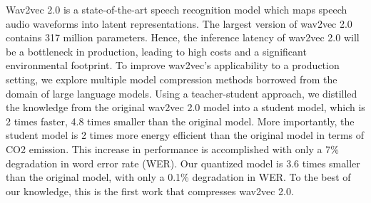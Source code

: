Wav2vec 2.0 is a state-of-the-art speech recognition model which maps speech audio waveforms into latent representations. The largest version of wav2vec 2.0 contains 317 million parameters. Hence, the inference latency of wav2vec 2.0 will be a bottleneck in production, leading to high costs and a significant environmental footprint. To improve wav2vec's applicability to a production setting, we explore multiple model compression methods borrowed from the domain of large language models. Using a teacher-student approach, we distilled the knowledge from the original wav2vec 2.0 model into a student model, which is 2 times faster, 4.8 times smaller than the original model. More importantly, the student model is 2 times more energy efficient than the original model in terms of CO2 emission. This increase in performance is accomplished with only a 7\% degradation in word error rate (WER). Our quantized model is 3.6 times smaller than the original model, with only a 0.1\% degradation in WER. To the best of our knowledge, this is the first work that compresses wav2vec 2.0.
